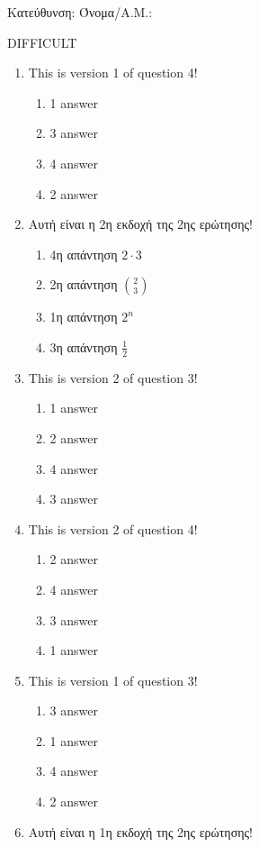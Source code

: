 \documentclass[a4paper, 11pt]{article}
\begin{document}
{\flushleft Κατεύθυνση: }
{\flushleft Όνομα/Α.Μ.: }
\vspace*{0.5cm}
\begin{center} {\Large  DIFFICULT } \end{center}
\begin{enumerate}
\item This is version 1 of question 4!
\begin{enumerate}[(1)]
    \item 1 answer
    \item 3 answer
    \item 4 answer
    \item 2 answer
\end{enumerate}
\item Αυτή είναι η 2η εκδοχή της 2ης ερώτησης!
\begin{enumerate}[(1)]
    \item 4η απάντηση $2\cdot 3$
    \item 2η απάντηση $\binom{2}{3}$
    \item 1η απάντηση $2^n$
    \item 3η απάντηση $\frac{1}{2}$
\end{enumerate}
\item This is version 2 of question 3!
\begin{enumerate}[(1)]
    \item 1 answer
    \item 2 answer
    \item 4 answer
    \item 3 answer
\end{enumerate}
\item This is version 2 of question 4!
\begin{enumerate}[(1)]
    \item 2 answer
    \item 4 answer
    \item 3 answer
    \item 1 answer
\end{enumerate}
\item This is version 1 of question 3!
\begin{enumerate}[(1)]
    \item 3 answer
    \item 1 answer
    \item 4 answer
    \item 2 answer
\end{enumerate}
\item Αυτή είναι η 1η εκδοχή της 2ης ερώτησης!

\end{enumerate}
\end{document}
